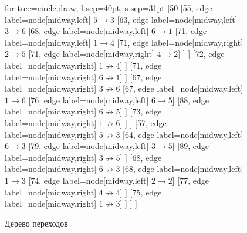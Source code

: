 \begin{figure}[H]
\begin{center}
	\begin{forest}
	for tree={circle,draw, l sep=40pt, s sep=31pt}
	[50 
		[55, edge label={node[midway,left] {$5 \rightarrow 3$}}  
			[63, edge label={node[midway,left] {$3 \rightarrow 6$}} 
				[68, edge label={node[midway,left] {$6 \rightarrow 1$}}
					[71, edge label={node[midway,left] {$1 \rightarrow 4$}}
						[71, edge label={node[midway,right] {$2 \rightarrow 5$}}
							[71, edge label={node[midway,right] {$4 \rightarrow 2$}}]
						]
					]
					[72, edge label={node[midway,right] {$1 \not\rightarrow 4$}}]
				]
				[71, edge label={node[midway,right] {$6 \not\rightarrow 1$}}]
			] 
			[67, edge label={node[midway,right] {$3 \not\rightarrow 6$}}
				[67, edge label={node[midway,left] {$1 \rightarrow 6$}}
					[76, edge label={node[midway,left] {$6 \rightarrow 5$}}]
					[88, edge label={node[midway,right] {$6 \not\rightarrow 5$}}]
				]
				[73, edge label={node[midway,right] {$1 \not\rightarrow 6$}}]
			] 
		]
		[57, edge label={node[midway,right] {$5 \not\rightarrow 3$}}
			[64, edge label={node[midway,left] {$6 \rightarrow 3$}}
				[79, edge label={node[midway,left] {$3 \rightarrow 5$}}]
				[89, edge label={node[midway,right] {$3 \not\rightarrow 5$}}]
			]
			[68, edge label={node[midway,right] {$6 \not\rightarrow 3$}}
				[68, edge label={node[midway,left] {$1 \rightarrow 3$}}
					[74, edge label={node[midway,left] {$2 \rightarrow 2$}}]
					[77, edge label={node[midway,right] {$4 \not\rightarrow 4$}}]
				]
				[75, edge label={node[midway,right] {$1 \not\rightarrow 3$}}]
			]
		]
	]
	\end{forest}
	\caption{Дерево переходов}
	\label{pic:graph}
\end{center}
\end{figure}


